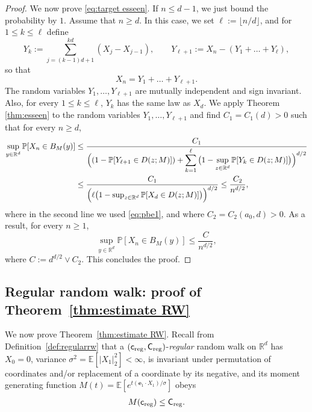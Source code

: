 \documentclass[11pt,a4paper]{article}
\numberwithin{equation}{section}
\theoremstyle{plain}
\theoremstyle{definition}
\newcommand\1{\mathds{1}}
\newcommand\CM{\mathsf{C}_{\textup{reg}}}
\newcommand\cM{\mathsf{c}_{\textup{reg}}}
\begin{document}
\begin{proof}
We now prove \eqref{eq:target esseen}. If $n\leq d-1$, we just bound the probability by $1$. Assume that $n\geq d$. In this case, we set $\ell:=\lfloor n/d\rfloor$,
and for $1\leq k \leq \ell$ define
\begin{equation}
	Y_k:= \sum_{j=(k-1)d+1}^{kd}(X_j-X_{j-1}), \qquad Y_{\ell+1}:=X_n-(Y_1+\ldots+Y_\ell),
\end{equation}
so that
\begin{equation}
	X_n=Y_1+\ldots+Y_{\ell+1}.
\end{equation}
The random variables $Y_1,\ldots,Y_{\ell+1}$ are mutually independent and sign invariant. Also, for every $1\leq k\leq \ell$, $Y_k$ has the same law as $X_d$. We apply Theorem \ref{thm:esseen} to the random variables $Y_1,\ldots,Y_{\ell+1}$ and find $C_1=C_1(d)>0$ such that for every $n\geq d$,
\begin{align}
	\sup_{y\in \mathbb R^d}\mathbb P[X_n\in B_M(y)]&\leq \frac{C_1}{\Big((1-\mathbb P[Y_{\ell+1}\in D(z;M)])+\displaystyle\sum_{k=1}^\ell\big(1-\sup_{z\in \mathbb R^d}\mathbb P[Y_k\in D(z;M)]\big)\Big)^{d/2}}\notag
	\\&\leq \frac{C_1}{\Big(\ell \big(1-\sup_{z\in \mathbb R^d}\mathbb P[X_d\in D(z;M)]\big)\Big)^{d/2}}\leq \frac{C_2}{n^{d/2}},
\end{align}
where in the second line we used \eqref{eq:pbe1}, and where $C_2=C_2(a_0,d)>0$. As a result, for every $n\geq 1$,
\begin{equation}
	\sup_{y\in \mathbb R^d}\mathbb P[X_n\in B_M(y)]\leq \frac{C}{n^{d/2}},
\end{equation}
where $C:=d^{d/2}\vee C_2$. This concludes the proof.
\end{proof}



\subsection{Regular random walk: proof of Theorem~\ref{thm:estimate RW}}
\label{sec:regrw}

We now prove Theorem~\ref{thm:estimate RW}.
Recall from Definition~\ref{def:regularrw} that a
$(\cM,\CM)$-\emph{regular} random walk on $\mathbb R^d$
has $X_0=0$,
variance $\sigma^2=\mathbb E[|X_1|_2^2]<\infty$,
is invariant under
permutation of coordinates and/or replacement of a coordinate by its negative, and
its moment generating function $M(t) = \mathbb E [e^{t(\mathbf{e}_1 \cdot X_1)/\sigma}]$ obeys
\begin{align}
    M(\cM) \le \CM.
\end{align}
\end{document}
